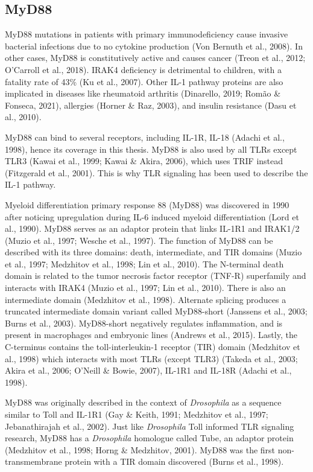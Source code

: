 \subsection{MyD88}
MyD88 mutations in patients with primary immunodeficiency cause invasive bacterial infections due to no cytokine production (Von Bernuth et al., 2008). In other cases, MyD88 is constitutively active and causes cancer (Treon et al., 2012; O’Carroll et al., 2018). IRAK4 deficiency is detrimental to children, with a fatality rate of 43\% (Ku et al., 2007). Other IL-1 pathway proteins are also implicated in diseases like rheumatoid arthritis (Dinarello, 2019; Romão \& Fonseca, 2021), allergies (Horner \& Raz, 2003), and insulin resistance (Dasu et al., 2010).

MyD88 can bind to several receptors, including IL-1R, IL-18 (Adachi et al., 1998), hence its coverage in this thesis. MyD88 is also used by all TLRs except TLR3 (Kawai et al., 1999; Kawai \& Akira, 2006), which uses TRIF instead (Fitzgerald et al., 2001). This is why TLR signaling has been used to describe the IL-1 pathway.

Myeloid differentiation primary response 88 (MyD88) was discovered in 1990 after noticing upregulation during IL-6 induced myeloid differentiation (Lord et al., 1990). MyD88 serves as an adaptor protein that links IL-1R1 and IRAK1/2 (Muzio et al., 1997; Wesche et al., 1997). The function of MyD88 can be described with its three domains: death, intermediate, and TIR domains (Muzio et al., 1997; Medzhitov et al., 1998; Lin et al., 2010). The N-terminal death domain is related to the tumor necrosis factor receptor (TNF-R) superfamily and interacts with IRAK4 (Muzio et al., 1997; Lin et al., 2010). There is also an intermediate domain (Medzhitov et al., 1998). Alternate splicing produces a truncated intermediate domain variant called MyD88-short (Janssens et al., 2003; Burns et al., 2003). MyD88-short negatively regulates inflammation, and is present in macrophages and embryonic lines (Andrews et al., 2015). Lastly, the C-terminus contains the toll-interleukin-1 receptor (TIR) domain (Medzhitov et al., 1998) which interacts with most TLRs (except TLR3) (Takeda et al., 2003; Akira et al., 2006; O'Neill \& Bowie, 2007), IL-1R1 and IL-18R (Adachi et al., 1998).

MyD88 was originally described in the context of \emph{Drosophila} as a sequence similar to Toll and IL-1R1 (Gay \& Keith, 1991; Medzhitov et al., 1997; Jebanathirajah et al., 2002). Just like \emph{Drosophila} Toll informed TLR signaling research, MyD88 has a \emph{Drosophila} homologue called Tube, an adaptor protein (Medzhitov et al., 1998; Horng \& Medzhitov, 2001). MyD88 was the first non-transmembrane protein with a TIR domain discovered (Burns et al., 1998).

